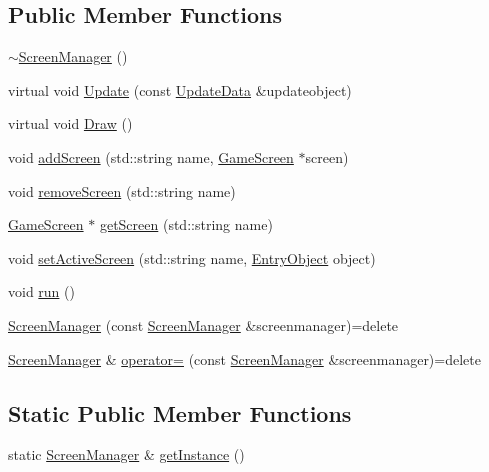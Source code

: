 \subsection*{Public Member Functions}
\begin{DoxyCompactItemize}
\item 
\hyperlink{class_screen_manager_a515ec6aabc9fefe3c1cfbe734877da1e}{$\sim$\-Screen\-Manager} ()
\item 
virtual void \hyperlink{class_screen_manager_acdc42b918d0c758bba56247977003210}{Update} (const \hyperlink{class_update_data}{Update\-Data} \&updateobject)
\item 
virtual void \hyperlink{class_screen_manager_ace42c010790b9fa5ba5e40accc56413a}{Draw} ()
\item 
void \hyperlink{class_screen_manager_a2e6e206c2ff265c534c802898c9c078b}{add\-Screen} (std\-::string name, \hyperlink{class_game_screen}{Game\-Screen} $\ast$screen)
\item 
void \hyperlink{class_screen_manager_a9bb115d54e94b72618361f4a347e26c8}{remove\-Screen} (std\-::string name)
\item 
\hyperlink{class_game_screen}{Game\-Screen} $\ast$ \hyperlink{class_screen_manager_a510ee04534746a6e72fa789539dc2d83}{get\-Screen} (std\-::string name)
\item 
void \hyperlink{class_screen_manager_ac7ebe41395bf83cc60c13e4fb502babd}{set\-Active\-Screen} (std\-::string name, \hyperlink{class_entry_object}{Entry\-Object} object)
\item 
void \hyperlink{class_screen_manager_abd5e01420eef9552b281de8539b95c75}{run} ()
\item 
\hyperlink{class_screen_manager_a65af2989683b8286705b5ff00b5017a7}{Screen\-Manager} (const \hyperlink{class_screen_manager}{Screen\-Manager} \&screenmanager)=delete
\item 
\hyperlink{class_screen_manager}{Screen\-Manager} \& \hyperlink{class_screen_manager_a04e300a0d2a9f6bdc73e4c4f75c5fbad}{operator=} (const \hyperlink{class_screen_manager}{Screen\-Manager} \&screenmanager)=delete
\end{DoxyCompactItemize}
\subsection*{Static Public Member Functions}
\begin{DoxyCompactItemize}
\item 
static \hyperlink{class_screen_manager}{Screen\-Manager} \& \hyperlink{class_screen_manager_ad4281372c025d4c80696299b0e8a1fbd}{get\-Instance} ()
\end{DoxyCompactItemize}
